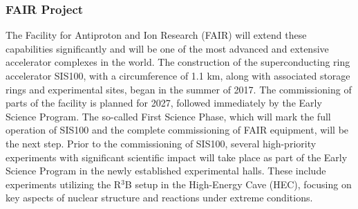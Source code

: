 \subsubsection{FAIR Project}
The Facility for Antiproton and Ion Research (FAIR) will extend these capabilities significantly and will be one of the most advanced and extensive accelerator complexes in the world. The construction of the superconducting ring accelerator SIS100, with a circumference of 1.1 km, along with associated storage rings and experimental sites, began in the summer of 2017. The commissioning of parts of the facility is planned for 2027, followed immediately by the Early Science Program.\newline  
The so-called First Science Phase, which will mark the full operation of SIS100 and the complete commissioning of FAIR equipment, will be the next step. Prior to the commissioning of SIS100, several high-priority experiments with significant scientific impact will take place as part of the Early Science Program in the newly established experimental halls. These include experiments utilizing the R$^3$B setup in the High-Energy Cave (HEC), focusing on key aspects of nuclear structure and reactions under extreme conditions.

